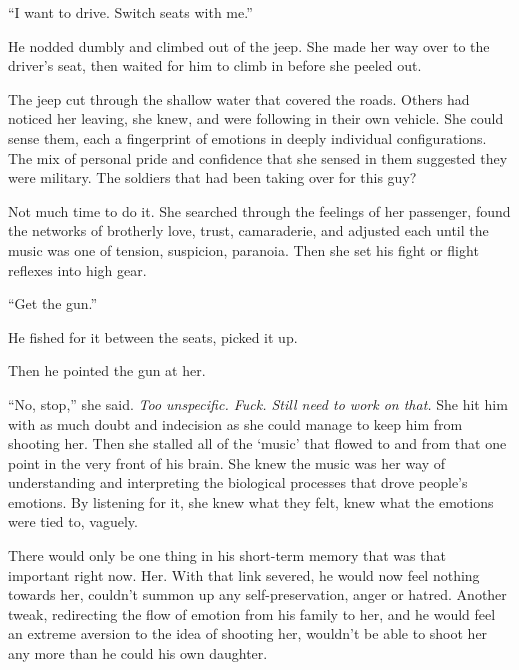``I want to drive.  Switch seats with me.''



He nodded dumbly and climbed out of the jeep.  She made her way over to the driver's seat, then waited for him to climb in before she peeled out.



The jeep cut through the shallow water that covered the roads.  Others had noticed her leaving, she knew, and were following in their own vehicle.  She could sense them, each a  fingerprint of emotions in deeply individual configurations.  The mix of personal pride and confidence that she sensed in them suggested they were military.  The soldiers that had been taking over for this guy?



Not much time to do it.  She searched through the feelings of her passenger, found the networks of brotherly love, trust, camaraderie, and adjusted each until the music was one of tension, suspicion, paranoia.  Then she set his fight or flight reflexes into high gear.



``Get the gun.''



He fished for it between the seats, picked it up.



Then he pointed the gun at her.



``No, stop,'' she said.  \emph{Too unspecific.  Fuck.  Still need to work on that.  }She hit him with as much doubt and indecision as she could manage to keep him from shooting her.  Then she stalled all of the `music' that flowed to and from that one point in the very front of his brain.  She knew the music was her way of understanding and interpreting the biological processes that drove people's emotions.  By listening for it, she knew what they felt, knew what the emotions were tied to, vaguely.



There would only be one thing in his short-term memory that was that important right now.  Her.  With that link severed, he would now feel nothing towards her, couldn't summon up any self-preservation, anger or hatred.  Another tweak, redirecting the flow of emotion from his family to her, and he would feel an extreme aversion to the idea of shooting her, wouldn't be able to shoot her any more than he could his own daughter.



